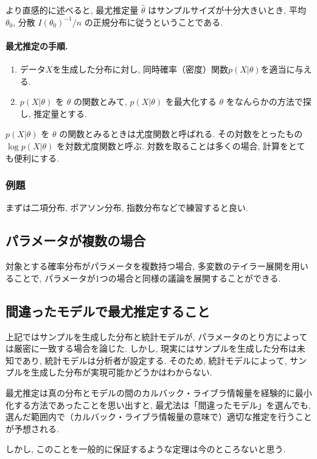 \documentclass[a4paper, 12pt]{jarticle}
\begin{document}
より直感的に述べると, 最尤推定量 $\hat \theta$ はサンプルサイズが十分大きいとき, 平均 $\theta_0$, 分散 $I(\theta_0)^{-1}/n$ の正規分布に従うということである. 

\paragraph{最尤推定の手順.} 
\begin{enumerate}
\item データ$X$を生成した分布に対し, 同時確率（密度）関数$p(X|\theta)$を適当に与える. 
\item $p(X|\theta)$ を $\theta$ の関数とみて, $p(X|\theta)$ を最大化する $\theta$ をなんらかの方法で探し, 推定量とする.
\end{enumerate}
$p(X|\theta)$ を $\theta$ の関数とみるときは尤度関数と呼ばれる. その対数をとったもの $\log p(X|\theta)$ を対数尤度関数と呼ぶ. 対数を取ることは多くの場合, 計算をとても便利にする. 

\subsubsection{例題}
まずは二項分布, ポアソン分布, 指数分布などで練習すると良い.

\subsection{パラメータが複数の場合}

対象とする確率分布がパラメータを複数持つ場合, 多変数のテイラー展開を用いることで, パラメータが1つの場合と同様の議論を展開することができる. 



\subsection{間違ったモデルで最尤推定すること}
上記ではサンプルを生成した分布と統計モデルが, パラメータのとり方によっては厳密に一致する場合を論じた. しかし, 現実にはサンプルを生成した分布は未知であり, 統計モデルは分析者が設定する. そのため, 統計モデルによって, サンプルを生成した分布が実現可能かどうかはわからない. 

最尤推定は真の分布とモデルの間のカルバック・ライブラ情報量を経験的に最小化する方法であったことを思い出すと, 最尤法は「間違ったモデル」を選んでも, 選んだ範囲内で（カルバック・ライブラ情報量の意味で）適切な推定を行うことが予想される. 

しかし, このことを一般的に保証するような定理は今のところないと思う. 
\end{document}
